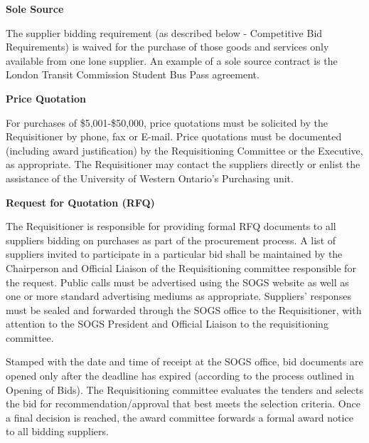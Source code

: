 \begin{longenum}[label*=\thesection.\arabic*., align=left]
\item \textbf{Sole Source}
\begin{longenum} [label*=\arabic*., align=left]
	\item The supplier bidding requirement (as described below - Competitive Bid Requirements) is waived for the purchase of those goods and services only available from one lone supplier. An example of a sole source contract is the London Transit Commission Student Bus Pass agreement.
\end{longenum}

\item \textbf{Price Quotation}

\begin{longenum} [label*=\arabic*., align=left]
		\item For purchases of \$5,001-\$50,000, price quotations must be solicited by the Requisitioner by phone, fax or E-mail. Price quotations must be documented (including award justification) by the Requisitioning Committee or the Executive, as appropriate. The Requisitioner may contact the suppliers directly or enlist the assistance of the University of Western Ontario's Purchasing unit.
		
\end{longenum}

\item \textbf{Request for Quotation (RFQ)}

\begin{longenum} [label*=\arabic*., align=left]
		\item The Requisitioner is responsible for providing formal RFQ documents to all suppliers bidding on purchases as part of the procurement process. A list of suppliers invited to participate in a particular bid shall be maintained by the Chairperson and Official Liaison of the Requisitioning committee responsible for the request. Public calls must be advertised using the SOGS website as well as one or more standard advertising mediums as appropriate. Suppliers' responses must be sealed and forwarded through the SOGS office to the Requisitioner, with attention to the SOGS President and Official Liaison to the requisitioning committee.
		
	\item	Stamped with the date and time of receipt at the SOGS office, bid documents are opened only after the deadline has expired (according to the process outlined in Opening of Bids). The Requisitioning committee evaluates the tenders and selects the bid for recommendation/approval that best meets the selection criteria. Once a final decision is reached, the award committee forwards a formal award notice to all bidding suppliers.
		

\end{longenum}
\end{longenum}
